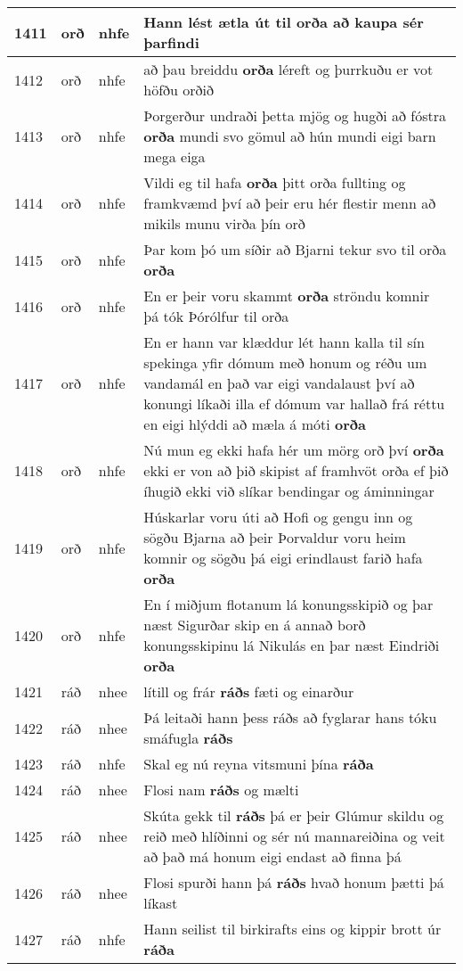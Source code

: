 \documentclass{article}
\begin{document}
\begin{longtable}{p{1cm}|p{1cm}|p{1cm}|p{13cm}}
\hline
1411&orð&nhfe&Hann lést ætla út til \textbf{orða} að kaupa sér þarfindi\\
\hline
1412&orð&nhfe&að þau breiddu \textbf{orða} léreft og þurrkuðu er vot höfðu orðið\\
\hline
1413&orð&nhfe&Þorgerður undraði þetta mjög og hugði að fóstra \textbf{orða} mundi svo gömul að hún mundi eigi barn mega eiga\\
\hline
1414&orð&nhfe&Vildi eg til hafa \textbf{orða} þitt orða fullting og framkvæmd því að þeir eru hér flestir menn að mikils munu virða þín orð\\
\hline
1415&orð&nhfe&Þar kom þó um síðir að Bjarni tekur svo til orða \textbf{orða} \\
\hline
1416&orð&nhfe&En er þeir voru skammt \textbf{orða} ströndu komnir þá tók Þórólfur til orða\\
\hline
1417&orð&nhfe&En er hann var klæddur lét hann kalla til sín spekinga yfir dómum með honum og réðu um vandamál en það var eigi vandalaust því að konungi líkaði illa ef dómum var hallað frá réttu en eigi hlýddi að mæla á móti \textbf{orða} \\
\hline
1418&orð&nhfe&Nú mun eg ekki hafa hér um mörg orð því \textbf{orða} ekki er von að þið skipist af framhvöt orða ef þið íhugið ekki við slíkar bendingar og áminningar\\
\hline
1419&orð&nhfe&Húskarlar voru úti að Hofi og gengu inn og sögðu Bjarna að þeir Þorvaldur voru heim komnir og sögðu þá eigi erindlaust farið hafa \textbf{orða} \\
\hline
1420&orð&nhfe&En í miðjum flotanum lá konungsskipið og þar næst Sigurðar skip en á annað borð konungsskipinu lá Nikulás en þar næst Eindriði \textbf{orða} \\
\hline
1421&ráð&nhee&lítill og frár \textbf{ráðs} fæti og einarður\\
\hline
1422&ráð&nhee&Þá leitaði hann þess ráðs að fyglarar hans tóku smáfugla \textbf{ráðs} \\
\hline
1423&ráð&nhfe&Skal eg nú reyna vitsmuni þína \textbf{ráða} \\
\hline
1424&ráð&nhee&Flosi nam \textbf{ráðs} og mælti\\
\hline
1425&ráð&nhee&Skúta gekk til \textbf{ráðs} þá er þeir Glúmur skildu og reið með hlíðinni og sér nú mannareiðina og veit að það má honum eigi endast að finna þá\\
\hline
1426&ráð&nhee&Flosi spurði hann þá \textbf{ráðs} hvað honum þætti þá líkast\\
\hline
1427&ráð&nhfe&Hann seilist til birkirafts eins og kippir brott úr \textbf{ráða} \\

\end{longtable}
\end{document}
